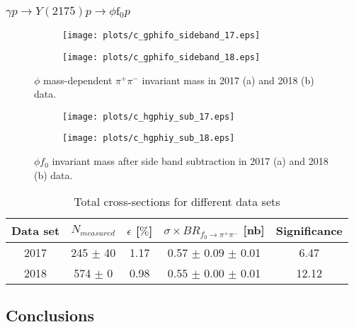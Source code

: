 \subsubsection{\texorpdfstring{$\gamma p \rightarrow Y(2175) p \rightarrow \phi \mathrm{f}_0 p$}{}}
\label{p.4.5.4}

\begin{figure}[H]
    \centering
    \begin{subfigure}[b]{0.45\textwidth}
        \texttt{[image: plots/c\_gphifo\_sideband\_17.eps]}
        \caption{}
        \label{fig.4.5.4.1.a}
    \end{subfigure}
    \begin{subfigure}[b]{0.45\textwidth}
        \texttt{[image: plots/c\_gphifo\_sideband\_18.eps]}
        \caption{}
        \label{fig.4.5.4.1.b}
    \end{subfigure}
    \caption{$\phi$ mass-dependent $\pi^+ \pi^-$ invariant mass in 2017 (a) and 2018 (b) data.}
    \label{fig:4.5.4.1}
\end{figure}

\begin{figure}[H]
    \centering
    \begin{subfigure}[b]{0.45\textwidth}
        \texttt{[image: plots/c\_hgphiy\_sub\_17.eps]}
        \caption{}
        \label{fig.4.5.4.2.a}
    \end{subfigure}
    \begin{subfigure}[b]{0.45\textwidth}
        \texttt{[image: plots/c\_hgphiy\_sub\_18.eps]}
        \caption{}
        \label{fig.4.5.4.2.b}
    \end{subfigure}
    \caption{$\phi f_0$ invariant mass after side band subtraction in 2017 (a) and 2018 (b) data.}
    \label{fig:4.5.4.2}
\end{figure}

\begin{table}[!htbp]
    \centering
    \caption{Total cross-sections for different data sets}
    \label{tab.4.5.4}
    \begin{tabular}{|c|c|c|c|c|}
        \hline
        Data set & $N_{measured}$ & $\epsilon$ [$\%$] & $\sigma \times BR_{f_{0}\rightarrow\pi^{+}\pi^{-}}$ [nb] & Significance\\
        \hline
        2017 & 245 $\pm$ 40 & 1.17 & 0.57 $\pm$ 0.09 $\pm$ 0.01 & 6.47 \\
        \hline
        2018 & 574 $\pm$ 0 & 0.98 & 0.55 $\pm$ 0.00 $\pm$ 0.01 & 12.12 \\
        \hline
    \end{tabular}
\end{table}

\subsection{Conclusions}
\label{p.4.6}